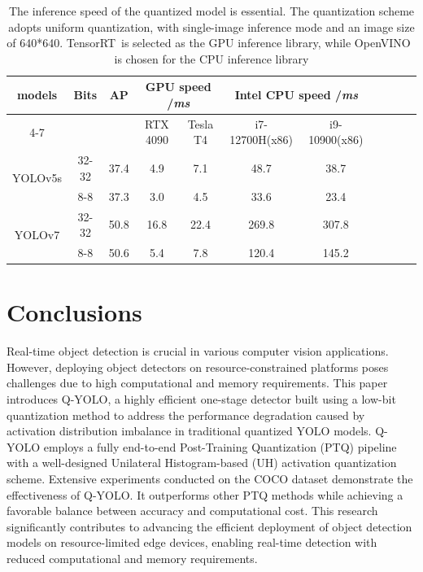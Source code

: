 \documentclass[runningheads]{llncs}
\begin{document}
\begin{table}[!t]
\centering
\caption{The inference speed of the quantized model is essential. The quantization scheme adopts uniform quantization, with single-image inference mode and an image size of 640*640. TensorRT~\cite{tensorrt}is selected as the GPU inference library, while OpenVINO~\cite{openvino} is chosen for the CPU inference library}

\begin{tabular}{ccccccccccc}
\hline
\multirow{2}{*}{models}  & \multirow{2}{*}{Bits}  &\multirow{2}{*}{AP} & \multicolumn{2}{c}{GPU speed /\textit{ms}} & \multicolumn{2}{c}{Intel CPU speed /\textit{ms}} \\ \cline{4-7} 
                         &                        &              &RTX 4090        & Tesla T4        & i7-12700H(x86)   & i9-10900(x86)  \\ \hline
\multirow{2}{*}{YOLOv5s} & 32-32                  &37.4        &4.9             & 7.1             & 48.7             & 38.7           \\ \cline{2-7} 
                         & 8-8                    &37.3 & 3.0              & 4.5            & 33.6             & 23.4           \\ \hline
\multirow{2}{*}{YOLOv7}  & 32-32                  &50.8 &16.8            & 22.4            & 269.8            & 307.8          \\ \cline{2-7} 
                         & 8-8                    &50.6 &5.4             & 7.8             & 120.4            & 145.2          \\ \hline
\end{tabular}
\label{exp_speed}
\end{table}






\section{Conclusions}
Real-time object detection is crucial in various computer vision applications. However, deploying object detectors on resource-constrained platforms poses challenges due to high computational and memory requirements. This paper introduces Q-YOLO, a highly efficient one-stage detector built using a low-bit quantization method to address the performance degradation caused by activation distribution imbalance in traditional quantized YOLO models. Q-YOLO employs a fully end-to-end Post-Training Quantization (PTQ) pipeline with a well-designed Unilateral Histogram-based (UH) activation quantization scheme. Extensive experiments conducted on the COCO dataset demonstrate the effectiveness of Q-YOLO. It outperforms other PTQ methods while achieving a favorable balance between accuracy and computational cost. This research significantly contributes to advancing the efficient deployment of object detection models on resource-limited edge devices, enabling real-time detection with reduced computational and memory requirements. 
%
%
%


%
\end{document}
